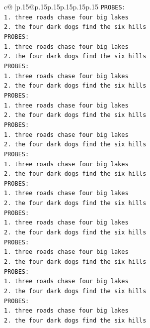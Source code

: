 \documentclass{article}
\begin{document}
{\begin{supertabular}{c@{$\;$}|p{.15\linewidth}@{}p{.15\linewidth}p{.15\linewidth}p{.15\linewidth}p{.15\linewidth}p{.15\linewidth}}
{{{\texttt{PROBES:} \\
\texttt{1. three roads chase four big lakes} \\
\texttt{2. the four dark dogs find the six hills} \\
\texttt{PROBES:} \\
\texttt{1. three roads chase four big lakes} \\
\texttt{2. the four dark dogs find the six hills} \\
\texttt{PROBES:} \\
\texttt{1. three roads chase four big lakes} \\
\texttt{2. the four dark dogs find the six hills} \\
\texttt{PROBES:} \\
\texttt{1. three roads chase four big lakes} \\
\texttt{2. the four dark dogs find the six hills} \\
\texttt{PROBES:} \\
\texttt{1. three roads chase four big lakes} \\
\texttt{2. the four dark dogs find the six hills} \\
\texttt{PROBES:} \\
\texttt{1. three roads chase four big lakes} \\
\texttt{2. the four dark dogs find the six hills} \\
\texttt{PROBES:} \\
\texttt{1. three roads chase four big lakes} \\
\texttt{2. the four dark dogs find the six hills} \\
\texttt{PROBES:} \\
\texttt{1. three roads chase four big lakes} \\
\texttt{2. the four dark dogs find the six hills} \\
\texttt{PROBES:} \\
\texttt{1. three roads chase four big lakes} \\
\texttt{2. the four dark dogs find the six hills} \\
\texttt{PROBES:} \\
\texttt{1. three roads chase four big lakes} \\
\texttt{2. the four dark dogs find the six hills} \\
\texttt{PROBES:} \\
\texttt{1. three roads chase four big lakes} \\
\texttt{2. the four dark dogs find the six hills} \\
}}}
\end{supertabular}}
\end{document}

